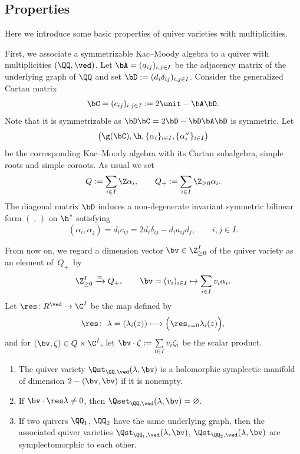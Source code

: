 \subsection{Properties}\label{subsec:property}

Here we introduce some basic properties of quiver varieties
with multiplicities.

First, we associate a symmetrizable Kac--Moody algebra
to a quiver with multiplicities $(\QQ,\ved)$.
Let $\bA=(a_{ij})_{i,j \in I}$ be the adjacency matrix of
the underlying graph of $\QQ$ and
set $\bD := (d_i\delta_{ij})_{i,j \in I}$.
Consider the generalized Cartan matrix
\[
\bC=(c_{ij})_{i,j \in I} := 2 \unit - \bA \bD.
\]
Note that it is symmetrizable as $\bD \bC = 2 \bD - \bD \bA \bD$
is symmetric.
Let
\[
\bigl( \g(\bC), \h, \{ \alpha_i \}_{i \in I}, \{ \alpha_i^\vee \}_{i \in I}
\bigr)
\]
be the corresponding Kac--Moody algebra
with its Cartan subalgebra, simple roots and simple coroots.
As usual we set
\[
Q := \sum_{i \in I} \Z \alpha_i, \qquad
Q_+ := \sum_{i \in I} \Z_{\geq 0} \alpha_i.
\]
The diagonal matrix $\bD$
induces a non-degenerate invariant symmetric bilinear form
$(\; , \,)$
on $\h^*$ satisfying
\[
( \alpha_i, \alpha_j) = d_i c_{ij}
= 2 d_i \delta_{ij} - d_i a_{ij} d_j,
\qquad  i,j \in I.
\]

From now on, we regard a dimension vector $\bv \in \Z_{\geq 0}^I$
of the quiver variety as an element of~$Q_+$~by
\[
\Z_{\geq 0}^I \xrightarrow{\simeq} Q_+,
\qquad \bv=(v_i)_{i \in I} \mapsto \sum_{i \in I} v_i \alpha_i.
\]
Let $\res \colon R^\ved \to \C^I$ be the map def\/ined by
\[
\res \colon \ \lambda=(\lambda_i(z)) \longmapsto
\Bigl( \res_{z=0} \lambda_i(z) \Bigr),
\]
and for $(\bv, \zeta) \in Q \times \C^I$,
let $\bv \cdot \zeta := \sum\limits_{i \in I} v_i \zeta_i$
be the scalar product.

\begin{Proposition}\label{prop:dim}\qquad
\begin{enumerate}\itemsep=0pt
\item[{\rm (i)}] The quiver variety $\Qst_{\QQ,\ved}(\lambda,\bv)$
is a holomorphic symplectic manifold of dimension
$2 -(\bv, \bv)$ if it is nonempty.

\item[{\rm (ii)}] If $\bv \cdot \res \lambda \neq 0$,
then $\Qset_{\QQ,\ved}(\lambda,\bv) = \varnothing$.

\item[{\rm (iii)}] If two quivers $\QQ_1$, $\QQ_2$ have the same underlying graph,
then the associated quiver varieties
$\Qst_{\QQ_1,\ved}(\lambda,\bv)$, $\Qst_{\QQ_2,\ved}(\lambda,\bv)$
are symplectomorphic to each other.
\end{enumerate}
\end{Proposition}

